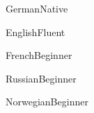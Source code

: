 \documentclass[a4paper,10pt]{cv}
\begin{document}
\begin{multicols}{2}
      \end{multicols}
      \vspace{-1.2em}
      \begin{multicols}{3}
        \begin{cvShortSkillItem}{German}{Native}
        \end{cvShortSkillItem}
        \begin{cvShortSkillItem}{English}{Fluent}
        \end{cvShortSkillItem}
        \begin{cvShortSkillItem}{French}{Beginner}
        \end{cvShortSkillItem}
        \begin{cvShortSkillItem}{Russian}{Beginner}
        \end{cvShortSkillItem}
        \begin{cvShortSkillItem}{Norwegian}{Beginner}
        \end{cvShortSkillItem}
      \end{multicols}
\end{document}
